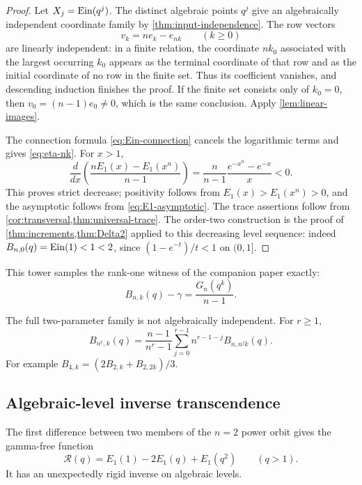 \begin{proof}
Let \(X_j=\operatorname{Ein}(q^j)\).  The distinct algebraic points \(q^j\) give an
algebraically independent coordinate family by
\cref{thm:input-independence}.  The row vectors
\[
 v_k=ne_k-e_{nk}\qquad(k\ge0)
\]
are linearly independent: in a finite relation, the coordinate \(nk_0\)
associated with the largest occurring \(k_0\) appears as the terminal
coordinate of that row and as the initial coordinate of no row in the
finite set.  Thus its coefficient vanishes, and descending induction
finishes the proof.  If the finite set consists only of \(k_0=0\), then
\(v_0=(n-1)e_0\ne0\), which is the same conclusion.  Apply
\cref{lem:linear-images}.

The connection formula \eqref{eq:Ein-connection} cancels the logarithmic
terms and gives \eqref{eq:eta-nk}.  For \(x>1\),
\[
 \frac d{dx}\left(
 \frac{nE_1(x)-E_1(x^n)}{n-1}\right)
 =\frac n{n-1}\frac{e^{-x^n}-e^{-x}}x<0.
\]
This proves strict decrease; positivity follows from
\(E_1(x)>E_1(x^n)>0\), and the asymptotic follows from
\eqref{eq:E1-asymptotic}.  The trace assertions follow from
\cref{cor:transversal,thm:universal-trace}.  The order-two construction is
the proof of \cref{thm:increments,thm:Delta2} applied to this decreasing
level sequence: indeed \(B_{n,0}(q)=\operatorname{Ein}(1)<1<2\), since
\((1-e^{-t})/t<1\) on \((0,1]\).
\end{proof}

This tower samples the rank-one witness of the companion paper exactly:
\begin{equation}\label{eq:B-Gn}
 B_{n,k}(q)-\gamma=\frac{G_n(q^k)}{n-1}.
\end{equation}

\begin{remark}
The full two-parameter family is not algebraically independent.  For
\(r\ge1\),
\begin{equation}\label{eq:cross-n-relation}
 B_{n^r,k}(q)=\frac{n-1}{n^r-1}
 \sum_{j=0}^{r-1}n^{r-1-j}B_{n,n^jk}(q).
\end{equation}
For example \(B_{4,k}=(2B_{2,k}+B_{2,2k})/3\).
\end{remark}

\subsection{Algebraic-level inverse transcendence}

The first difference between two members of the \(n=2\) power orbit gives
the gamma-free function
\begin{equation}\label{eq:scriptR-def}
 \mathscr R(q)=E_1(1)-2E_1(q)+E_1(q^2)\qquad(q>1).
\end{equation}
It has an unexpectedly rigid inverse on algebraic levels.

